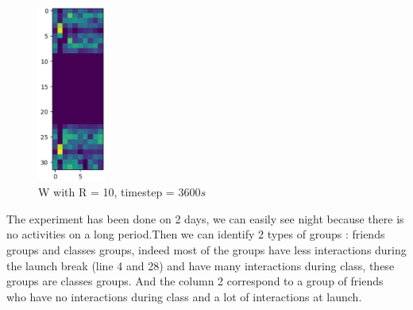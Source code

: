 \documentclass{article}
\begin{document}
\begin{figure}[H]
    \centering
    \includegraphics[width=0.2\textwidth]{images/W_R=10_t=3600.png}
    \caption{W with R = 10, timestep = 3600$s$}
\end{figure}

The experiment has been done on 2 days, we can easily see night because there is no activities on a long period.Then we can identify
2 types of groups : friends groups and classes groups, indeed most of the groups have less interactions during the launch break (line 4 and 28)
and have many interactions during class, these groups are classes groups. And the column 2 correspond to a group of friends who have
no interactions during class and a lot of interactions at launch.
\end{document}
